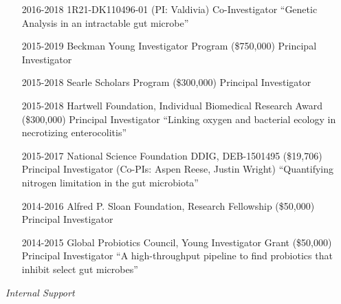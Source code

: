 \documentclass[overlapped,line,11pt]{res}
\begin{document}
\begin{resume}
\begin{itemize}[leftmargin=2cm, style=sameline]
\item[2016-2018] 1R21-DK110496-01 (PI: Valdivia)  \newline Co-Investigator
  \newline ``Genetic Analysis in an intractable gut microbe''

\item[2015-2019] Beckman Young Investigator Program (\$750,000) \newline Principal Investigator 

\item[2015-2018] Searle Scholars Program (\$300,000) \newline Principal Investigator 
  
\item[2015-2018] Hartwell Foundation, Individual Biomedical Research Award (\$300,000) \newline Principal Investigator 
  \newline ``Linking oxygen and bacterial ecology in necrotizing enterocolitis''

\item[2015-2017] National Science Foundation DDIG, DEB-1501495 (\$19,706) \newline Principal Investigator (Co-PIs: Aspen Reese, Justin Wright) 
  \newline ``Quantifying nitrogen limitation in the gut microbiota''

\item[2014-2016] Alfred P. Sloan Foundation, Research Fellowship (\$50,000) \newline Principal Investigator 

\item[2014-2015] Global Probiotics Council, Young Investigator Grant (\$50,000) \newline Principal Investigator 
  \newline ``A high-throughput pipeline to find probiotics that
  inhibit select gut microbes''

\end{itemize}

\emph{Internal Support}
\vspace{.1in}

\begin{itemize}[leftmargin=2cm, style=sameline]


\end{itemize}
\end{resume}
\end{document}
